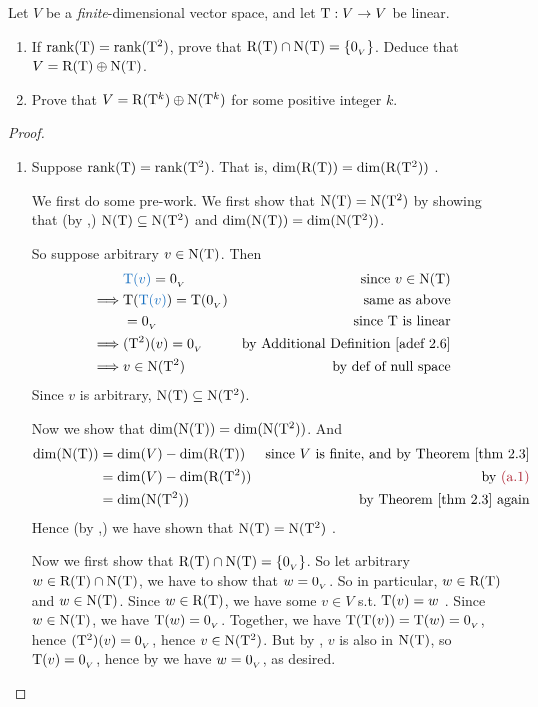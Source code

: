 \begin{exercise} \label{exercise 2.3.16}
Let \(V\) be a \emph{finite}-dimensional vector space, and let \(\mathrm{T} : V \to V\) be linear.
\begin{enumerate}
\item If \(\mathrm{rank}(\mathrm{T}) = \mathrm{rank}(\mathrm{T}^2)\), prove that \(\mathrm{R(T)} \cap \mathrm{N(T)} = \{ 0_{_V} \}\).
    Deduce that \(V = \mathrm{R(T)} \oplus \mathrm{N(T)}\).
\item Prove that \(V = \mathrm{R}(\mathrm{T}^k) \oplus \mathrm{N}(\mathrm{T}^k)\) for some positive integer \(k\).
\end{enumerate}
\end{exercise}

\begin{proof} \ 

\begin{enumerate}
\item Suppose \(\mathrm{rank}(\mathrm{T}) = \mathrm{rank}(\mathrm{T}^2)\).
That is, \(\dim(\mathrm{R(T)}) = \dim(\mathrm{R}(\mathrm{T}^2))\) .

We first do some pre-work.
We first show that \(\mathrm{N(T)} = \mathrm{N}(\mathrm{T}^2)\) by showing that (by ,) \(\mathrm{N(T)} \subseteq \mathrm{N}(\mathrm{T}^2)\) and \(\dim(\mathrm{N(T)}) = \dim(\mathrm{N}(\mathrm{T}^2))\).

So suppose arbitrary \(v \in \mathrm{N(T)}\).
Then
\begin{align*}
             & \BLUE{\T(v)} = \OV & \text{since \(v \in \NULLT\)} \\
    \implies & \T(\BLUE{\T(v)}) = \T(\OV) & \text{same as above} \\
             & = \OV & \text{since \(\T\) is linear} \\
    \implies & (\T^2)(v) = \OV & \text{by \ADEF{2.6}} \\
    \implies & v \in \NULL(\T^2) & \text{by def of null space}
\end{align*}
Since \(v\) is arbitrary, \(\mathrm{N(T)} \subseteq \mathrm{N}(\mathrm{T}^2)\).

Now we show that \(\dim(\mathrm{N(T)}) = \dim(\mathrm{N}(\mathrm{T}^2))\).
And
\begin{align*}
    \dim(\NULLT) & = \dim(V) - \dim(\RANGET) & \text{since \(V\) is finite, and by \THM{2.3}} \\
                 & = \dim(V) - \dim(\RANGE(\T^2)) & \text{by \MAROON{(a.1)}} \\
                 & = \dim(\NULL(\T^2)) & \text{by \THM{2.3} again}
\end{align*}
Hence (by ,) we have shown that \(\mathrm{N(T)} = \mathrm{N}(\mathrm{T}^2)\) .

Now we first show that \(\mathrm{R(T)} \cap \mathrm{N(T)} = \{ 0_{_V} \}\).
So let arbitrary \(w \in \mathrm{R(T)} \cap \mathrm{N(T)}\), we have to show that \(w = 0_{_V}\).
So in particular, \(w \in \mathrm{R(T)}\) and \(w \in \mathrm{N(T)}\).
Since \(w \in \mathrm{R(T)}\), we have some \(v \in V\) s.t. \(\mathrm{T}(v) = w\) .
Since \(w \in \mathrm{N(T)}\), we have \(\mathrm{T}(w) = 0_{_V}\).
Together, we have \(\mathrm{T}(\mathrm{T}(v)) = \mathrm{T}(w) = 0_{_V}\), hence \((\mathrm{T}^2)(v) = 0_{_V}\), hence \(v \in \mathrm{N}(\mathrm{T}^2)\).
But by , \(v\) is also in \(\mathrm{N(T)}\), so \(\mathrm{T}(v) = 0_{_V}\), hence by  we have \(w = 0_{_V}\), as desired.


\end{enumerate}
\end{proof}
